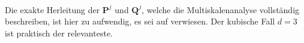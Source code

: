 \\
Die exakte Herleitung der $\mathbf{P}^j$ und $\mathbf{Q}^j$, welche die Multiskalenanalyse vollständig beschreiben, ist hier zu aufwendig, es sei auf \cite{finkelstein94} verwiesen. Der kubische Fall $d=3$ ist praktisch der relevanteste. %
%
%
